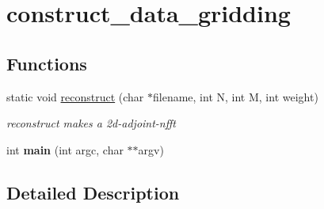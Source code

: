 \hypertarget{group__applications__mri2d__construct__data__gridding}{\section{construct\-\_\-data\-\_\-gridding}
\label{group__applications__mri2d__construct__data__gridding}
}
\subsection*{Functions}
\begin{DoxyCompactItemize}
\item 
\hypertarget{group__applications__mri2d__construct__data__gridding_gaafaf486ca8f1725dce039d2e2d150340}{static void \hyperlink{group__applications__mri2d__construct__data__gridding_gaafaf486ca8f1725dce039d2e2d150340}{reconstruct} (char $\ast$filename, int N, int M, int weight)}\label{group__applications__mri2d__construct__data__gridding_gaafaf486ca8f1725dce039d2e2d150340}

\begin{DoxyCompactList}\small\item\em reconstruct makes a 2d-\/adjoint-\/nfft \end{DoxyCompactList}\item 
\hypertarget{group__applications__mri2d__construct__data__gridding_ga3c04138a5bfe5d72780bb7e82a18e627}{int {\bfseries main} (int argc, char $\ast$$\ast$argv)}\label{group__applications__mri2d__construct__data__gridding_ga3c04138a5bfe5d72780bb7e82a18e627}

\end{DoxyCompactItemize}


\subsection{Detailed Description}

